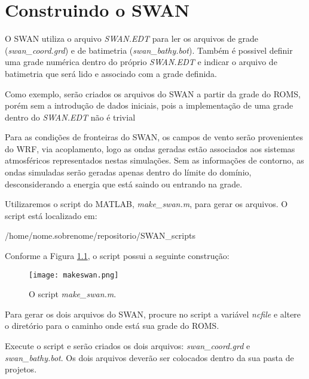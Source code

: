 \bigskip
\chapter{Construindo o SWAN}

\noindent O SWAN utiliza o arquivo \textit{SWAN.EDT} para ler os  arquivos de grade (\textit{swan\_coord.grd}) e
          de batimetria (\textit{swan\_bathy.bot}). Também é possivel definir uma grade numérica dentro do próprio
          \textit{SWAN.EDT} e indicar o arquivo de batimetria que será lido e associado com a grade definida.
\bigskip

\noindent Como exemplo, serão criados os arquivos do SWAN a partir da grade do ROMS, porém sem a introdução de dados iniciais, 
          pois a implementação de uma grade dentro do \textit{SWAN.EDT} não é trivial    
\bigskip

\noindent Para as condições de fronteiras do SWAN, os campos de vento serão provenientes do WRF, via acoplamento, logo
          as ondas geradas estão associados aos sistemas atmosféricos representados nestas simulações. Sem as informações 
          de contorno, as ondas simuladas serão geradas apenas dentro do límite do domínio, desconsiderando a energia que 
          está saindo ou entrando na grade.
\bigskip

\noindent Utilizaremos o script do MATLAB, \textit{make\_swan.m}, para gerar os arquivos. O script está localizado em:  
\bigskip

\begin{bashcode}
/home/nome.sobrenome/repositorio/SWAN_scripts
\end{bashcode}
\bigskip

\noindent Conforme a Figura \textcolor{bleu_cite}{\ref{makeswan}}, o script possui a seguinte construção:
\bigskip

\begin{figure}[H]
    \centering
    \texttt{[image: makeswan.png]}
    \caption{O script \textit{make\_swan.m}.}
    \label{makeswan}
\end{figure}
\bigskip

\noindent Para gerar os dois arquivos do SWAN, procure no script a variável \textit{ncfile} e altere o diretório 
          para o caminho onde está sua grade do ROMS.
\bigskip

\noindent Execute o script e serão criados os dois arquivos: \textit {swan\_coord.grd} e \textit{swan\_bathy.bot}. 
           Os dois arquivos deverão ser colocados dentro da sua pasta de projetos.
\bigskip

